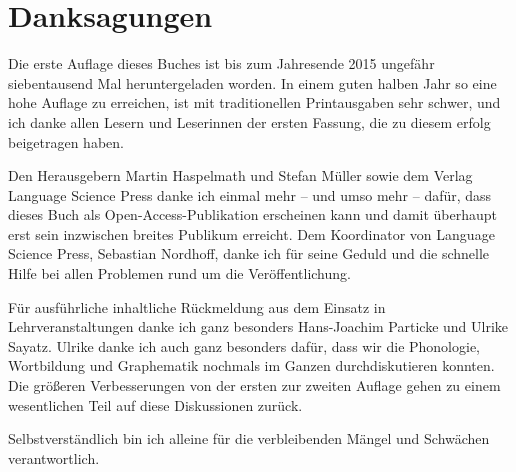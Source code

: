 \section*{Danksagungen}

Die erste Auflage dieses Buches ist bis zum Jahresende 2015 ungefähr siebentausend Mal heruntergeladen worden.
In einem guten halben Jahr so eine hohe Auflage zu erreichen, ist mit traditionellen Printausgaben sehr schwer, und ich danke allen Lesern und Leserinnen der ersten Fassung, die zu diesem erfolg beigetragen haben.

Den Herausgebern Martin Haspelmath und Stefan Müller sowie dem Verlag Language Science Press danke ich einmal mehr -- und umso mehr -- dafür, dass dieses Buch als Open-Access-Publikation erscheinen kann und damit überhaupt erst sein inzwischen breites Publikum erreicht.
Dem Koordinator von Language Science Press, Sebastian Nordhoff, danke ich für seine Geduld und die schnelle Hilfe bei allen Problemen rund um die Veröffentlichung.

Für ausführliche inhaltliche Rückmeldung aus dem Einsatz in Lehrveranstaltungen danke ich ganz besonders Hans-Joachim Particke und Ulrike Sayatz.
Ulrike danke ich auch ganz besonders dafür, dass wir die Phonologie, Wortbildung und Graphematik nochmals im Ganzen durchdiskutieren konnten.
Die größeren Verbesserungen von der ersten zur zweiten Auflage gehen zu einem wesentlichen Teil auf diese Diskussionen zurück.

Selbstverständlich bin ich alleine für die verbleibenden Mängel und Schwächen verantwortlich.
